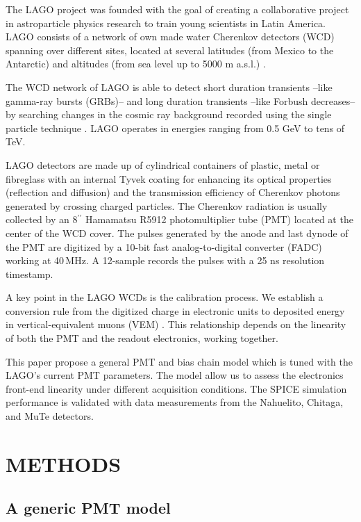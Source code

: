 \documentclass[letterpaper, 10 pt, conference]{ieeeconf}  %
\begin{document}
The LAGO project was founded with the goal of creating a collaborative project in astroparticle physics research to train young scientists in Latin America. LAGO consists of a network of own made water Cherenkov detectors (WCD) spanning over different sites, located at several latitudes (from Mexico to the Antarctic) and altitudes (from sea level up to 5000 m a.s.l.) \cite{Sidelnik2016}. 

The WCD network of LAGO is able to detect short duration transients --like gamma-ray bursts (GRBs)-- and long duration transients --like Forbush decreases-- \cite{Durn2016,Asorey2018} by searching changes in the cosmic ray background recorded using the single particle technique \cite{Vernetto2000, Leon2018}. LAGO operates in energies ranging from 0.5 GeV to tens of TeV.

LAGO detectors are made up of cylindrical containers of plastic, metal or fibreglass with an internal Tyvek coating for enhancing its optical properties (reflection and diffusion) and the transmission efficiency of Cherenkov photons generated by crossing charged particles. The Cherenkov radiation is usually collected by an 8$^{\prime\prime}$ Hamamatsu R5912 photomultiplier tube (PMT) located at the center of the WCD cover. The pulses generated by the anode and last dynode of the PMT are digitized by a 10-bit fast analog-to-digital converter (FADC) working at 40\,MHz. A 12-sample records the pulses with a 25 ns resolution timestamp.

A key point in the LAGO WCDs is the calibration process. We establish a conversion rule from the digitized charge in electronic units to deposited energy in vertical-equivalent muons (VEM) \cite{Bertou2006, Galindo2017}. This relationship depends on the linearity of both the PMT and the readout electronics, working together. 

This paper propose a general PMT and bias chain model which is tuned with the LAGO's current PMT parameters. The model allow us to assess the electronics front-end linearity under different acquisition conditions. The SPICE simulation performance is validated with data measurements from the Nahuelito, Chitaga, and MuTe detectors. 

\section{METHODS}

\subsection{A generic PMT model}
\end{document}
